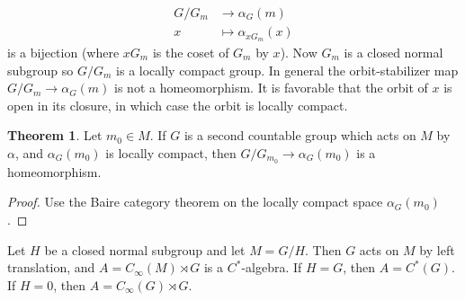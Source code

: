 \documentclass[12pt]{report}
\theoremstyle{definition}
\newtheorem{theorem}{Theorem}[chapter]
\begin{document}
\begin{align*}
    G/G_m &\to \alpha_G(m)\\
    x &\mapsto \alpha_{xG_m}(x)
\end{align*}
    is a bijection (where $xG_m$ is the coset of $G_m$ by $x$). Now $G_m$ is a closed normal subgroup so $G/G_m$ is a locally compact group. In general the orbit-stabilizer map $G/G_m \to \alpha_G(m)$ is not a homeomorphism. It is favorable that the orbit of $x$ is open in its closure, in which case the orbit is locally compact.
\begin{theorem}
    Let $m_0 \in M$. If $G$ is a second countable group which acts on $M$ by $\alpha$, and $\alpha_G(m_0)$ is locally compact, then $G/G_{m_0} \to \alpha_G(m_0)$ is a homeomorphism.
\end{theorem}
\begin{proof}
    Use the Baire category theorem on the locally compact space $\alpha_G(m_0)$.
\end{proof}
    Let $H$ be a closed normal subgroup and let $M = G/H$. Then $G$ acts on $M$ by left translation, and $A = C_\infty(M) \rtimes G$ is a $C^*$-algebra. If $H = G$, then $A = C^*(G)$. If $H = 0$, then $A = C_\infty(G) \rtimes G$.
\end{document}
